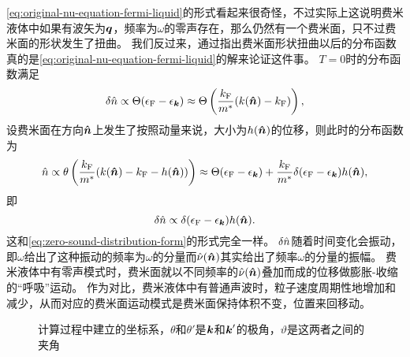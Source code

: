 \eqref{eq:original-nu-equation-fermi-liquid}的形式看起来很奇怪，不过实际上这说明费米液体中如果有波矢为$\vb*{q}$，频率为$\omega$的零声存在，那么仍然有一个费米面，只不过费米面的形状发生了扭曲。
我们反过来，通过指出费米面形状扭曲以后的分布函数真的是\eqref{eq:original-nu-equation-fermi-liquid}的解来论证这件事。%
$T=0$时的分布函数满足
\[
    \var{\hat{n}} \propto \Theta(\epsilon_\text{F} - \epsilon_{\vb*{k}}) \approx \Theta\left( \frac{k_\text{F}}{m^*} (k(\vu*{n}) - k_\text{F}) \right),
\]
设费米面在方向$\vu*{n}$上发生了按照动量来说，大小为$h(\vu*{n})$的位移，则此时的分布函数为
\[
    \hat{n} \propto \theta\left( \frac{k_\text{F}}{m^*} (k(\vu*{n}) - k_\text{F} - h(\vu*{n})) \right) \approx \Theta(\epsilon_\text{F} - \epsilon_{\vb*{k}}) + \frac{k_\text{F}}{m^*} \delta(\epsilon_\text{F} - \epsilon_{\vb*{k}}) h(\vu*{n}),
\]
即
\[
    \var{\hat{n}} \propto \delta(\epsilon_\text{F} - \epsilon_{\vb*{k}}) h(\vu*{n}).
\]
这和\eqref{eq:zero-sound-distribution-form}的形式完全一样。
$\var{\hat{n}}$随着时间变化会振动，即$\omega$给出了这种振动的频率为$\omega$的分量而$\hat{\nu}(\vu*{n})$其实给出了频率$\omega$的分量的振幅。
费米液体中有零声模式时，费米面就以不同频率的$\hat{\nu}(\vu*{n})$叠加而成的位移做膨胀-收缩的“呼吸”运动。
作为对比，费米液体中有普通声波时，粒子速度周期性地增加和减少，从而对应的费米面运动模式是费米面保持体积不变，位置来回移动。

\begin{figure}
    \centering
    
    \caption{计算过程中建立的坐标系，$\theta$和$\theta'$是$\vb*{k}$和$\vb*{k}'$的极角，$\vartheta$是这两者之间的夹角}
\end{figure}


